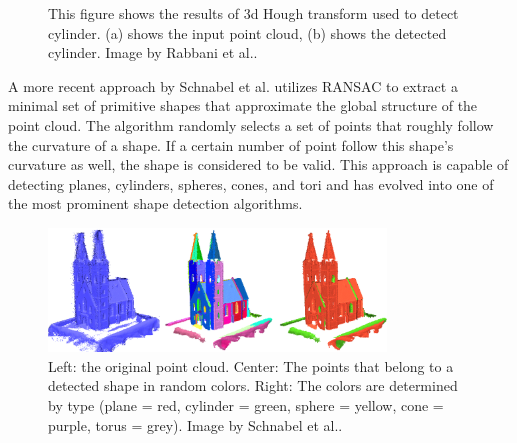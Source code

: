 \begin{figure}
\centering
{}
\caption{This figure shows the results of 3d Hough transform used to detect cylinder. (a) shows the input point cloud, (b) shows the detected cylinder. Image by Rabbani et al.\cite{rabbani2005efficient}.}
\label{fig:hough_cylinder}
\end{figure}


A more recent approach by Schnabel et al.\cite{schnabel-2007-efficient} utilizes RANSAC\cite{fischler1981random} to extract a minimal set of primitive shapes that approximate the global structure of the point cloud. The algorithm randomly selects a set of points that roughly follow the curvature of a shape. If a certain number of point follow this shape's curvature as well, the shape is considered to be valid. This approach is capable of detecting planes, cylinders, spheres, cones, and tori and has evolved into one of the most prominent shape detection algorithms. 

\begin{figure}
    \centering
    \includegraphics[width=0.8\textwidth]{Related_Work/schnabel_example.png}%
    \caption{Left: the original point cloud. Center: The points that belong to a detected shape in random colors. Right: The colors are determined by type (plane = red, cylinder = green, sphere = yellow, cone = purple, torus = grey). Image by Schnabel et al.\cite{schnabel-2007-efficient}. }
    \label{fig:schnabel_church}
\end{figure}

